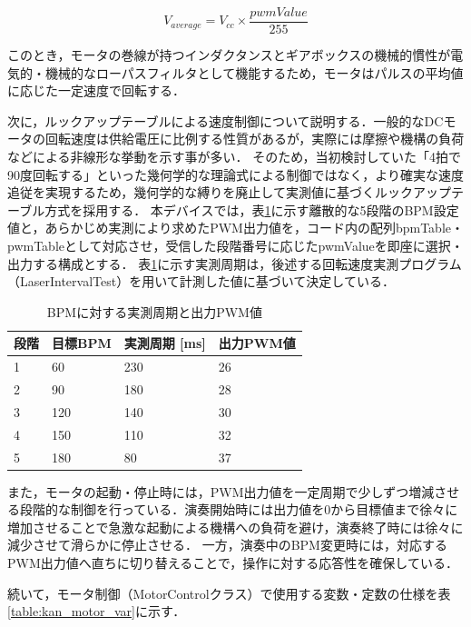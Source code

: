 \begin{equation}
    \label{eq:average}
    V_{average} = V_{cc} \times \frac{pwmValue}{255}
\end{equation}

\noindent
このとき，モータの巻線が持つインダクタンスとギアボックスの機械的慣性が電気的・機械的なローパスフィルタとして機能するため，モータはパルスの平均値に応じた一定速度で回転する．

次に，ルックアップテーブルによる速度制御について説明する．一般的なDCモータの回転速度は供給電圧に比例する性質があるが\cite{ref:control}，実際には摩擦や機構の負荷などによる非線形な挙動を示す事が多い．
そのため，当初検討していた「4拍で90度回転する」といった幾何学的な理論式による制御ではなく，より確実な速度追従を実現するため，幾何学的な縛りを廃止して実測値に基づくルックアップテーブル方式を採用する．
本デバイスでは，表\ref{tab:pwm_lut}に示す離散的な5段階のBPM設定値と，あらかじめ実測により求めたPWM出力値を，コード内の配列bpmTable・pwmTableとして対応させ，受信した段階番号に応じたpwmValueを即座に選択・出力する構成とする．
表\ref{tab:pwm_lut}に示す実測周期は，後述する回転速度実測プログラム（LaserIntervalTest）を用いて計測した値に基づいて決定している．

\begin{table}[H]
    \centering
    \caption{BPMに対する実測周期と出力PWM値}
    \label{tab:pwm_lut}
    \begin{tabular}{llll}
    \hline
    段階 & 目標BPM & 実測周期 [ms] & 出力PWM値 \\ \hline\hline
    1 & 60  & 230 & 26 \\
    2 & 90  & 180 & 28 \\
    3 & 120 & 140 & 30 \\
    4 & 150 & 110 & 32 \\
    5 & 180 & 80  & 37 \\ \hline
    \end{tabular}
\end{table}

\noindent
また，モータの起動・停止時には，PWM出力値を一定周期で少しずつ増減させる段階的な制御を行っている．演奏開始時には出力値を0から目標値まで徐々に増加させることで急激な起動による機構への負荷を避け，演奏終了時には徐々に減少させて滑らかに停止させる．
一方，演奏中のBPM変更時には，対応するPWM出力値へ直ちに切り替えることで，操作に対する応答性を確保している．

\iffalse
続いて，モータ制御（MotorControlクラス）で使用する変数・定数の仕様を表\ref{table:kan_motor_var}に示す．

